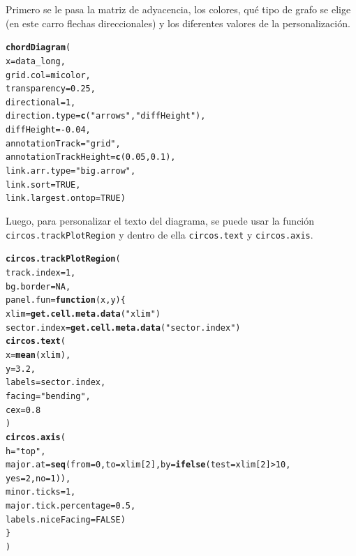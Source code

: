\documentclass{article}\usepackage[]{graphicx}\usepackage[]{color}
\makeatletter
\newcommand{\hlnum}[1]{\textcolor[rgb]{0.686,0.059,0.569}{#1}}%
\newcommand{\hlstr}[1]{\textcolor[rgb]{0.192,0.494,0.8}{#1}}%
\newcommand{\hlopt}[1]{\textcolor[rgb]{0,0,0}{#1}}%
\newcommand{\hlstd}[1]{\textcolor[rgb]{0.345,0.345,0.345}{#1}}%
\newcommand{\hlkwa}[1]{\textcolor[rgb]{0.161,0.373,0.58}{\textbf{#1}}}%
\newcommand{\hlkwb}[1]{\textcolor[rgb]{0.69,0.353,0.396}{#1}}%
\newcommand{\hlkwc}[1]{\textcolor[rgb]{0.333,0.667,0.333}{#1}}%
\newcommand{\hlkwd}[1]{\textcolor[rgb]{0.737,0.353,0.396}{\textbf{#1}}}%
\newenvironment{kframe}{%
 \def\at@end@of@kframe{}%
 \ifinner\ifhmode%
  \def\at@end@of@kframe{\end{minipage}}%
  \begin{minipage}{\columnwidth}%
 \fi\fi%
 \def\FrameCommand##1{\hskip\@totalleftmargin \hskip-\fboxsep
 \colorbox{shadecolor}{##1}\hskip-\fboxsep
     \hskip-\linewidth \hskip-\@totalleftmargin \hskip\columnwidth}%
 \MakeFramed {\advance\hsize-\width
   \@totalleftmargin\z@ \linewidth\hsize
   \@setminipage}}%
 {\par\unskip\endMakeFramed%
 \at@end@of@kframe}
\newenvironment{knitrout}{}{} %
\makeatother
\begin{document}
Primero se le pasa la matriz de adyacencia, los colores, qu\'e tipo de grafo se elige (en este carro flechas direccionales) y los diferentes valores de la personalizaci\'on.
\begin{knitrout}
\color{fgcolor}\begin{kframe}
\begin{alltt}
\hlkwd{chordDiagram}\hlstd{(}
  \hlkwc{x} \hlstd{= data_long,}
  \hlkwc{grid.col} \hlstd{= micolor,}
  \hlkwc{transparency} \hlstd{=} \hlnum{0.25}\hlstd{,}
  \hlkwc{directional} \hlstd{=} \hlnum{1}\hlstd{,}
  \hlkwc{direction.type} \hlstd{=} \hlkwd{c}\hlstd{(}\hlstr{"arrows"}\hlstd{,} \hlstr{"diffHeight"}\hlstd{),}
  \hlkwc{diffHeight}  \hlstd{=} \hlopt{-}\hlnum{0.04}\hlstd{,}
  \hlkwc{annotationTrack} \hlstd{=} \hlstr{"grid"}\hlstd{,}
  \hlkwc{annotationTrackHeight} \hlstd{=} \hlkwd{c}\hlstd{(}\hlnum{0.05}\hlstd{,} \hlnum{0.1}\hlstd{),}
  \hlkwc{link.arr.type} \hlstd{=} \hlstr{"big.arrow"}\hlstd{,}
  \hlkwc{link.sort} \hlstd{=} \hlnum{TRUE}\hlstd{,}
  \hlkwc{link.largest.ontop} \hlstd{=} \hlnum{TRUE}\hlstd{)}
\end{alltt}
\end{kframe}
\end{knitrout}
Luego, para personalizar el texto del diagrama, se puede usar la funci\'on \texttt{circos.trackPlotRegion} y dentro de ella \texttt{circos.text} y \texttt{circos.axis}.
\begin{knitrout}
\color{fgcolor}\begin{kframe}
\begin{alltt}
\hlkwd{circos.trackPlotRegion}\hlstd{(}
  \hlkwc{track.index} \hlstd{=} \hlnum{1}\hlstd{,}
  \hlkwc{bg.border} \hlstd{=} \hlnum{NA}\hlstd{,}
  \hlkwc{panel.fun} \hlstd{=} \hlkwa{function}\hlstd{(}\hlkwc{x}\hlstd{,} \hlkwc{y}\hlstd{) \{}
    \hlstd{xlim} \hlkwb{=} \hlkwd{get.cell.meta.data}\hlstd{(}\hlstr{"xlim"}\hlstd{)}
    \hlstd{sector.index} \hlkwb{=} \hlkwd{get.cell.meta.data}\hlstd{(}\hlstr{"sector.index"}\hlstd{)}
    \hlkwd{circos.text}\hlstd{(}
      \hlkwc{x} \hlstd{=} \hlkwd{mean}\hlstd{(xlim),}
      \hlkwc{y} \hlstd{=} \hlnum{3.2}\hlstd{,}
      \hlkwc{labels} \hlstd{= sector.index,}
      \hlkwc{facing} \hlstd{=} \hlstr{"bending"}\hlstd{,}
      \hlkwc{cex} \hlstd{=} \hlnum{0.8}
    \hlstd{)}
    \hlkwd{circos.axis}\hlstd{(}
      \hlkwc{h} \hlstd{=} \hlstr{"top"}\hlstd{,}
      \hlkwc{major.at} \hlstd{=} \hlkwd{seq}\hlstd{(}\hlkwc{from} \hlstd{=} \hlnum{0}\hlstd{,} \hlkwc{to} \hlstd{= xlim[}\hlnum{2}\hlstd{],} \hlkwc{by} \hlstd{=} \hlkwd{ifelse}\hlstd{(}\hlkwc{test} \hlstd{= xlim[}\hlnum{2}\hlstd{]}\hlopt{>}\hlnum{10}\hlstd{,}
                                                         \hlkwc{yes} \hlstd{=} \hlnum{2}\hlstd{,} \hlkwc{no} \hlstd{=} \hlnum{1}\hlstd{)),}
      \hlkwc{minor.ticks} \hlstd{=} \hlnum{1}\hlstd{,}
      \hlkwc{major.tick.percentage} \hlstd{=} \hlnum{0.5}\hlstd{,}
      \hlkwc{labels.niceFacing} \hlstd{=} \hlnum{FALSE}\hlstd{)}
  \hlstd{\}}
\hlstd{)}
\end{alltt}
\end{kframe}
\end{knitrout}
\end{document}
